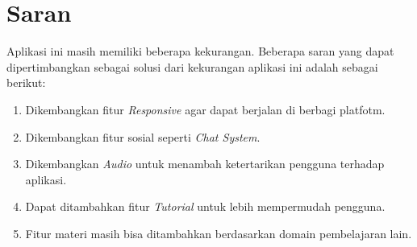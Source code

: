 \section{Saran}
Aplikasi ini masih memiliki beberapa kekurangan. Beberapa saran yang 
dapat dipertimbangkan sebagai solusi dari kekurangan aplikasi ini adalah sebagai 
berikut:
\begin{enumerate}
    \item Dikembangkan fitur \textit{Responsive} agar dapat berjalan di berbagi platfotm.
    \item Dikembangkan fitur sosial seperti \textit{Chat System}.
    \item Dikembangkan \textit{Audio} untuk menambah ketertarikan pengguna terhadap aplikasi.
    \item Dapat ditambahkan fitur \textit{Tutorial} untuk lebih mempermudah pengguna.
    \item Fitur materi masih bisa ditambahkan berdasarkan domain pembelajaran lain.
\end{enumerate}